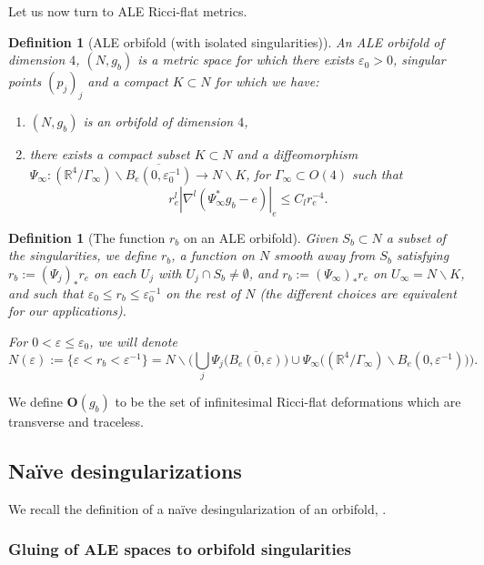 \documentclass[11pt,reqno]{amsart}
\numberwithin{equation}{section}
\newtheorem{defn}[thm]{Definition}
\theoremstyle{definition}
\theoremstyle{remark}
\begin{document}
Let us now turn to ALE Ricci-flat metrics.

\begin{defn}[ALE orbifold (with isolated singularities)]\label{def orb ale}
    An ALE orbifold of dimension $4$, $(N,g_{b})$ is a metric space for which there exists $\varepsilon_0>0$, singular points $(p_j)_j$ and a compact $K\subset N$ for which we have:
    \begin{enumerate}
        \item $(N,g_b)$ is an orbifold of dimension $4$,
        \item there exists a compact subset $K\subset N$ and a diffeomorphism $\Psi_\infty: (\mathbb{R}^4\slash\Gamma_\infty)\backslash \overline{B_e(0,\varepsilon_0^{-1})} \to N\backslash K$, for $\Gamma_\infty\subset O(4)$ such that $$r_e^l|\nabla^l(\Psi_\infty^* g_b - {e})|_{{e}}\leqslant C_l r_e^{-4}.$$
    \end{enumerate}
\end{defn}

\begin{defn}[The function $r_{b}$ on an ALE orbifold]\label{rb}
Given $S_b\subset N$ a subset of the singularities, we define $r_b$, a function on $N$ { smooth away from $S_b$} satisfying $r_b:= (\Psi_j)_* r_e$ on each $U_j$ with $U_j\cap S_b\neq \emptyset$, and $r_{b}:= (\Psi_\infty)_* r_e$ on $U_\infty = N\backslash K$, and such that $\varepsilon_0\leqslant  r_{b}\leqslant \varepsilon_0^{-1}$ on the rest of $N$ (the different choices are equivalent for our applications).

For $0<\varepsilon\leqslant\varepsilon_0$, we will denote $$N(\varepsilon):= \{\varepsilon<r_b<\varepsilon^{-1}\} = N\backslash  \Big(\bigcup_j \Psi_j\Big(\overline{B_e(0,\varepsilon)}\Big) \cup \Psi_\infty \Big((\mathbb{R}^4\slash\Gamma_\infty)\backslash B_e(0,\varepsilon^{-1})\Big)\Big).$$
\end{defn}

We define $\mathbf{O}(g_b)$ to be the set of infinitesimal Ricci-flat deformations which are transverse and traceless. 



\subsection{Naïve desingularizations}\label{reecriture controle}

We recall the definition of a naïve desingularization of an orbifold, \cite{ozu1}.

\subsubsection{Gluing of ALE spaces to orbifold singularities}
\end{document}
